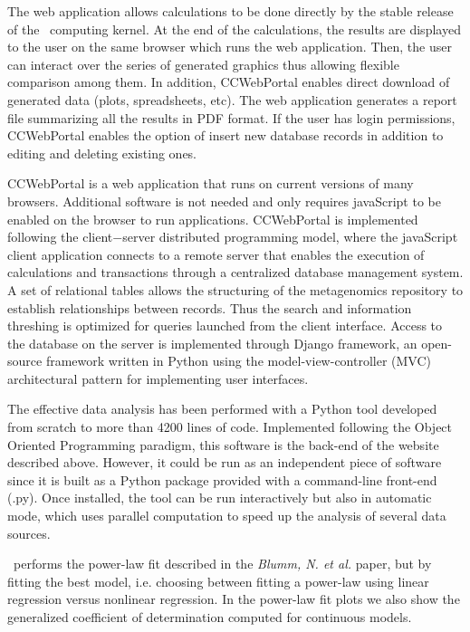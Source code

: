 The web application allows calculations to be done directly by the stable release of the \CC\ computing kernel. At the end of the calculations, the results are displayed to the user on the same browser which runs the web application. Then, the user can interact over the series of generated graphics thus allowing flexible comparison among them. In addition, CCWebPortal enables direct download of generated data (plots, spreadsheets, etc). The web application generates a report file summarizing all the results in PDF format. If the user has login permissions, CCWebPortal enables the option of insert new database records in addition to editing and deleting existing ones.

CCWebPortal is a web application that runs on current versions of many browsers. Additional software is not needed and only requires javaScript to be enabled on the browser to run applications. 
CCWebPortal is implemented following the client$-$server distributed programming model, where the javaScript client application connects to a remote server that enables the execution of calculations and transactions through a centralized database management system. A set of relational tables allows the structuring of the metagenomics repository to establish relationships between records. Thus the search and information threshing is optimized for queries launched from the client interface. Access to the database on the server is implemented through Django framework, an open-source framework written in Python using the model-view-controller (MVC) architectural pattern for implementing user interfaces.

The effective data analysis has been performed with a Python tool developed from scratch to more than 4200 lines of code. Implemented following the Object Oriented Programming paradigm, this software is the back-end of the website described above. However, it could be run as an independent piece of software since it is built as a Python package provided with a command-line front-end (\CC.py). Once installed, the tool can be run interactively but also in automatic mode, which uses parallel computation to speed up the analysis of several data sources. 

\CC\ performs the power-law fit described in the \emph{Blumm, N. et al.} paper, but by fitting the best model, i.e. choosing between fitting a power-law using linear regression versus nonlinear regression\cite{ecology}. In the power-law fit plots we also show the generalized coefficient of determination computed for continuous models\cite{genR2,disR2}.

